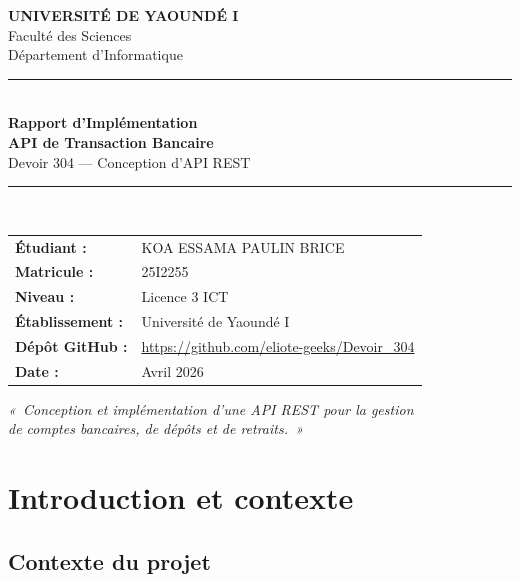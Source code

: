 \documentclass[12pt,a4paper]{article}
\begin{document}

\begin{titlepage}
\centering
\vspace*{1cm}

{\Large\bfseries UNIVERSITÉ DE YAOUNDÉ I\\[0.3cm]}
{\large Faculté des Sciences\\[0.1cm]}
{\large Département d'Informatique\\[2cm]}

\noindent\rule{\linewidth}{2pt}\\[0.5cm]
{\Huge\bfseries\color{primary} Rapport d'Implémentation}\\[0.3cm]
{\LARGE\bfseries API de Transaction Bancaire}\\[0.3cm]
{\large Devoir 304 — Conception d'API REST}\\[0.3cm]
\noindent\rule{\linewidth}{2pt}\\[2cm]

\begin{tabular}{ll}
\textbf{Étudiant :} & KOA ESSAMA PAULIN BRICE \\[0.3cm]
\textbf{Matricule :} & 25I2255 \\[0.3cm]
\textbf{Niveau :} & Licence 3 ICT \\[0.3cm]
\textbf{Établissement :} & Université de Yaoundé I \\[0.3cm]
\textbf{Dépôt GitHub :} & \url{https://github.com/eliote-geeks/Devoir_304} \\[0.3cm]
\textbf{Date :} & Avril 2026 \\
\end{tabular}

\vfill
{\large\textit{«~Conception et implémentation d'une API REST pour la gestion\\de comptes bancaires, de dépôts et de retraits.~»}}

\end{titlepage}

\tableofcontents
\newpage

\section{Introduction et contexte}

\subsection{Contexte du projet}
\end{document}
